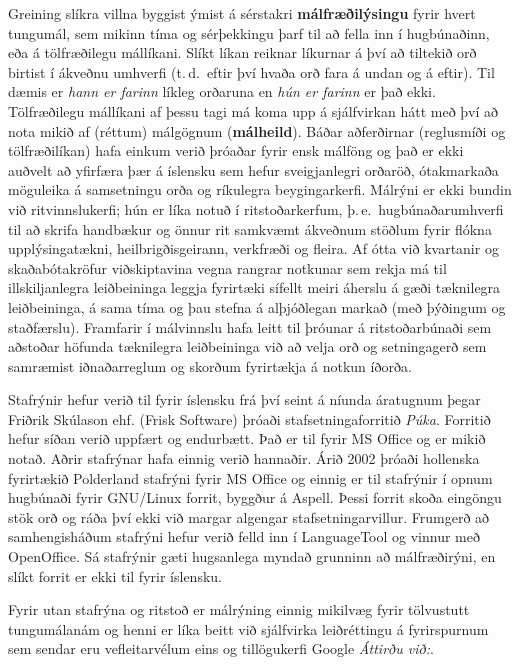 \begin{multicols}{2}
Greining slíkra villna byggist ýmist á sérstakri \textbf{málfræðilýsingu} fyrir hvert tungumál, sem mikinn tíma og sérþekkingu þarf til að fella inn í hugbúnaðinn, eða á tölfræðilegu mállíkani. Slíkt líkan reiknar líkurnar á því að tiltekið orð birtist í ákveðnu umhverfi (t.\,d.~eftir því hvaða orð fara á undan og á eftir). Til dæmis er \textit{hann er farinn} líkleg orðaruna en \textit{hún er farinn} er það ekki. Tölfræðilegu mállíkani af þessu tagi má koma upp á sjálfvirkan hátt með því að nota mikið af (réttum) málgögnum (\textbf{málheild}). Báðar aðferðirnar (reglusmíði og tölfræðilíkan) hafa einkum verið þróaðar fyrir ensk málföng og það er ekki auðvelt að yfirfæra þær á íslensku sem hefur sveigjanlegri orðaröð, ótakmarkaða möguleika á samsetningu orða og ríkulegra beygingarkerfi. 
Málrýni er ekki bundin við ritvinnslukerfi; hún er líka notuð í ritstoðarkerfum, þ.\,e.~hugbúnaðarumhverfi til að skrifa handbækur og önnur rit samkvæmt ákveðnum stöðlum fyrir flókna upplýsingatækni, heilbrigðisgeirann, verkfræði og fleira. Af ótta við kvartanir og skaðabótakröfur viðskiptavina vegna rangrar notkunar sem rekja má til illskiljanlegra leiðbeininga leggja fyrirtæki sífellt meiri áherslu á gæði tæknilegra leiðbeininga, á sama tíma og þau stefna á alþjóðlegan markað (með þýðingum og staðfærslu). Framfarir í málvinnslu hafa leitt til þróunar á ritstoðarbúnaði sem aðstoðar höfunda tæknilegra leiðbeininga við að velja orð og setningagerð sem samræmist iðnaðarreglum og skorðum fyrirtækja á notkun íðorða.

Stafrýnir hefur verið til fyrir íslensku frá því seint á níunda áratugnum þegar Friðrik Skúlason ehf. (Frisk Software) þróaði stafsetningaforritið \textit{Púka}. Forritið hefur síðan verið uppfært og endurbætt. Það er til fyrir MS Office og er mikið notað. Aðrir stafrýnar hafa einnig verið hannaðir. Árið 2002 þróaði hollenska fyrirtækið Polderland stafrýni fyrir MS Office og einnig er til stafrýnir í opnum hugbúnaði fyrir GNU/Linux forrit, byggður á Aspell. Þessi forrit skoða eingöngu stök orð og ráða því ekki við margar algengar stafsetningarvillur. Frumgerð að samhengisháðum stafrýni hefur verið felld inn í LanguageTool \cite{lto1} og vinnur með OpenOffice. Sá stafrýnir gæti hugsanlega myndað grunninn að mál\-fræði\-rýni, en slíkt forrit er ekki til fyrir íslensku. 

Fyrir utan stafrýna og ritstoð er málrýning einnig mikilvæg fyrir tölvustutt tungumálanám og henni er líka beitt við sjálfvirka leiðréttingu á fyrirspurnum sem sendar eru vefleitarvélum eins og tillögukerfi Google \textit{Áttirðu við:}.


\end{multicols}
